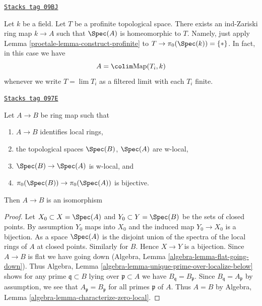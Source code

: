 \begin{example}
\label{proetale-example-construct-space}
\href{https://stacks.math.columbia.edu/tag/09BJ}{\texttt{Stacks tag 09BJ}}

Let $k$ be a field. Let $T$ be a profinite topological space.
There exists an ind-Zariski ring map $k \to A$ such that
$\Spec(A)$ is homeomorphic to $T$. Namely, just apply
Lemma \ref{proetale-lemma-construct-profinite} to $T \to \pi_0(\Spec(k)) = \{*\}$.
In fact, in this case we have
$$
A = \colim \text{Map}(T_i, k)
$$
whenever we write $T = \lim T_i$ as a filtered limit with each $T_i$ finite.
\end{example}

\begin{lemma}
\label{proetale-lemma-w-local-morphism-equal-points-stalks-is-iso}
\href{https://stacks.math.columbia.edu/tag/097E}{\texttt{Stacks tag 097E}}

Let $A \to B$ be ring map such that
\begin{enumerate}
\item $A \to B$ identifies local rings,
\item the topological spaces $\Spec(B)$, $\Spec(A)$ are w-local,
\item $\Spec(B) \to \Spec(A)$ is w-local, and
\item $\pi_0(\Spec(B)) \to \pi_0(\Spec(A))$ is bijective.
\end{enumerate}
Then $A \to B$ is an isomorphism
\end{lemma}

\begin{proof}
Let $X_0 \subset X = \Spec(A)$ and $Y_0 \subset Y = \Spec(B)$ be the
sets of closed points. By assumption $Y_0$ maps into $X_0$ and
the induced map $Y_0 \to X_0$ is a bijection.
As a space $\Spec(A)$ is the disjoint union of the spectra
of the local rings of $A$ at closed points.
Similarly for $B$. Hence $X \to Y$ is a bijection.
Since $A \to B$ is flat we have going down
(Algebra, Lemma \ref{algebra-lemma-flat-going-down}).
Thus Algebra, Lemma \ref{algebra-lemma-unique-prime-over-localize-below}
shows for any prime $\mathfrak q \subset B$ lying over
$\mathfrak p \subset A$ we have $B_\mathfrak q = B_\mathfrak p$.
Since $B_\mathfrak q = A_\mathfrak p$ by assumption, we
see that $A_\mathfrak p = B_\mathfrak p$ for all primes $\mathfrak p$
of $A$. Thus $A = B$ by
Algebra, Lemma \ref{algebra-lemma-characterize-zero-local}.
\end{proof}

